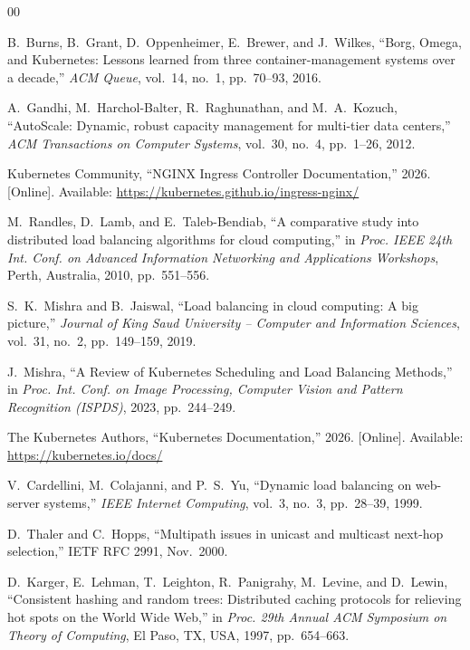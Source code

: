 \documentclass[conference]{IEEEtran}
\begin{document}
\begin{thebibliography}{00}

B.~Burns, B.~Grant, D.~Oppenheimer, E.~Brewer, and J.~Wilkes, ``Borg, Omega, and Kubernetes: Lessons learned from three container-management systems over a decade,'' \textit{ACM Queue}, vol.~14, no.~1, pp.~70--93, 2016.

A.~Gandhi, M.~Harchol-Balter, R.~Raghunathan, and M.~A.~Kozuch, ``AutoScale: Dynamic, robust capacity management for multi-tier data centers,'' \textit{ACM Transactions on Computer Systems}, vol.~30, no.~4, pp.~1--26, 2012.

Kubernetes Community, ``NGINX Ingress Controller Documentation,'' 2026. [Online]. Available: \url{https://kubernetes.github.io/ingress-nginx/}

M.~Randles, D.~Lamb, and E.~Taleb-Bendiab, ``A comparative study into distributed load balancing algorithms for cloud computing,'' in \textit{Proc. IEEE 24th Int. Conf. on Advanced Information Networking and Applications Workshops}, Perth, Australia, 2010, pp.~551--556.

S.~K.~Mishra and B.~Jaiswal, ``Load balancing in cloud computing: A big picture,'' \textit{Journal of King Saud University -- Computer and Information Sciences}, vol.~31, no.~2, pp.~149--159, 2019.

J.~Mishra, ``A Review of Kubernetes Scheduling and Load Balancing Methods,'' in \textit{Proc. Int. Conf. on Image Processing, Computer Vision and Pattern Recognition (ISPDS)}, 2023, pp.~244--249.

The Kubernetes Authors, ``Kubernetes Documentation,'' 2026. [Online]. Available: \url{https://kubernetes.io/docs/}

V.~Cardellini, M.~Colajanni, and P.~S.~Yu, ``Dynamic load balancing on web-server systems,'' \textit{IEEE Internet Computing}, vol.~3, no.~3, pp.~28--39, 1999.

D.~Thaler and C.~Hopps, ``Multipath issues in unicast and multicast next-hop selection,'' IETF RFC 2991, Nov.~2000.

D.~Karger, E.~Lehman, T.~Leighton, R.~Panigrahy, M.~Levine, and D.~Lewin, ``Consistent hashing and random trees: Distributed caching protocols for relieving hot spots on the World Wide Web,'' in \textit{Proc. 29th Annual ACM Symposium on Theory of Computing}, El Paso, TX, USA, 1997, pp.~654--663.


\end{thebibliography}
\end{document}
